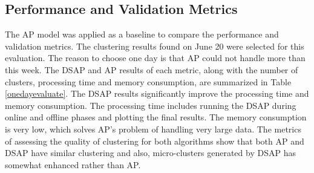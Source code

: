 \subsection{Performance and Validation Metrics}

The AP model was applied as a baseline to compare the performance and validation metrics. The clustering results found on June 20 were selected for this evaluation. The reason to choose one day is that AP could not handle more than this week.
The DSAP and AP results of each metric, along with the number of clusters, processing time and memory consumption, are summarized in Table \ref{onedayevaluate}. The DSAP results significantly improve the processing time and memory consumption. The processing time includes running the DSAP during online and offline phases and plotting the final results. The memory consumption is very low, which solves AP's problem of handling very large data. The metrics of assessing the quality of clustering for both algorithms show that both AP and DSAP have similar clustering and also, micro-clusters generated by DSAP has somewhat enhanced rather than AP.





